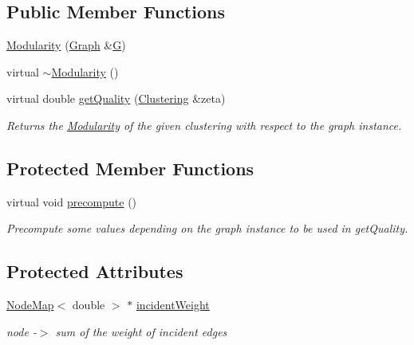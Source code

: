 \subsection*{Public Member Functions}
\begin{DoxyCompactItemize}
\item 
\hyperlink{class_ensemble_clustering_1_1_modularity_ac2cac4e5a1aa00af4fce69123c57f94b}{Modularity} (\hyperlink{class_ensemble_clustering_1_1_graph}{Graph} \&\hyperlink{class_ensemble_clustering_1_1_quality_measure_a8639730658036901338b34bc59bf4cec}{G})
\item 
virtual \hyperlink{class_ensemble_clustering_1_1_modularity_a57b3f96bdd38a7920317e7587518715d}{$\sim$\-Modularity} ()
\item 
virtual double \hyperlink{class_ensemble_clustering_1_1_modularity_a516c1fa49609c233d01a76d0f0d4c255}{get\-Quality} (\hyperlink{class_ensemble_clustering_1_1_clustering}{Clustering} \&zeta)
\begin{DoxyCompactList}\small\item\em Returns the \hyperlink{class_ensemble_clustering_1_1_modularity}{Modularity} of the given clustering with respect to the graph instance. \end{DoxyCompactList}\end{DoxyCompactItemize}
\subsection*{Protected Member Functions}
\begin{DoxyCompactItemize}
\item 
virtual void \hyperlink{class_ensemble_clustering_1_1_modularity_a5c449dd6b3b3485dcc497edd8dc3c156}{precompute} ()
\begin{DoxyCompactList}\small\item\em Precompute some values depending on the graph instance to be used in get\-Quality. \end{DoxyCompactList}\end{DoxyCompactItemize}
\subsection*{Protected Attributes}
\begin{DoxyCompactItemize}
\item 
\hyperlink{class_ensemble_clustering_1_1_node_map}{Node\-Map}$<$ double $>$ $\ast$ \hyperlink{class_ensemble_clustering_1_1_modularity_abc6c72d596cd3f00cce8c8c87e602df1}{incident\-Weight}
\begin{DoxyCompactList}\small\item\em node -\/$>$ sum of the weight of incident edges \end{DoxyCompactList}\end{DoxyCompactItemize}


